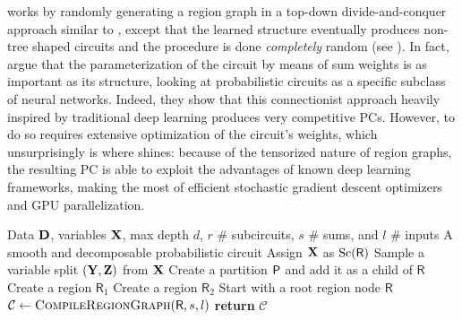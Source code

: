  works by randomly generating a region graph in a top-down divide-and-conquer
approach similar to , except that the learned structure eventually produces
non-tree shaped circuits and the procedure is done \emph{completely} random (see
). In fact, \citet{peharz20a} argue that the parameterization of the circuit by
means of sum weights is as important as its structure, looking at probabilistic circuits as a
specific subclass of neural networks. Indeed, they show that this connectionist approach heavily
inspired by traditional deep learning produces very competitive PCs. However, to do so requires
extensive optimization of the circuit's weights, which unsurprisingly is where 
shines: because of the tensorized nature of region graphs, the resulting PC is able to exploit the
advantages of known deep learning frameworks, making the most of efficient stochastic gradient
descent optimizers and GPU parallelization.

\begin{algorithm}[t]
  \caption{}\label{alg:ratspn}
  \begin{algorithmic}[1]
    \Require Data $\mathbf{D}$, variables $\mathbf{X}$, max depth $d$, $r$ \# subcircuits, $s$ \# sums,
      and $l$ \# inputs
    \Ensure A smooth and decomposable probabilistic circuit
      \State Assign $\mathbf{X}$ as $\operatorname*{\normalfont{Sc}}(\textsf{R})$
      \State Sample a variable split $(\mathbf{Y},\mathbf{Z})$ from $\mathbf{X}$
      \State Create a partition $\operatorname{\textup{\textsf{P}}}$ and add it as a child of $\textsf{R}$
          \State Create a region $\textsf{R}_1$
          \State {}
        \EndIf
          \State Create a region $\textsf{R}_2$
          \State {}
        \EndIf
      \EndIf
    \EndFunction
    \State Start with a root region node $\textsf{R}$
      \State {}
    \EndFor
    \State $\mathcal{C}\gets\textproc{CompileRegionGraph}(\textsf{R},s,l)$
    \State \textbf{return} $\mathcal{C}$
  \end{algorithmic}
\end{algorithm}

